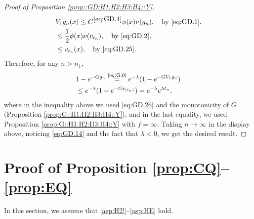 \documentclass[12pt,a4paper]{amsart}
\numberwithin{equation}{section}
\theoremstyle{plain}
\theoremstyle{definition}
\theoremstyle{remark}
\begin{document}
\begin{proof}[Proof of Proposition \ref{prop::GD:H1:H2:H3:H4::Y}]
\begin{align}
	& V_1g_n(x) \leq C^{\eqref{eq:GD.1}} \phi(x)\nu(g_n),\quad\text{by \eqref{eq:GD.1}},
	\\& \leq \frac{1}{2}\phi(x)\nu(v_{t_n}),\quad\text{by \eqref{eq:GD.2}},
	\\\label{eq:GD.26} & \leq v_{t_n}(x),\quad\text{by \eqref{eq:GD.25}}.
\end{align}
	Therefore, for any $n>n_1$,
\begin{align}
	& 1 - e^{- Gg_n}
	\overset{\text{\eqref{eq:G.0}}}= e^{- \lambda} (1- e^{- GV_1g_n})
	\\&\leq e^{- \lambda} (1- e^{- G v_{(t_n)}}) 
	= e^{- \lambda} e^{\lambda t_n},
\end{align}
	where in the inequality above we used \eqref{eq:GD.26} and the monotonicity of $G$ (Proposition \ref{prop:G::H1:H2:H3:H4::Y}), and in the last equality, we used Proposition \ref{prop:G::H1:H2:H3:H4::Y} with $f = \infty$.
	Taking $n\to \infty$ in the display above, noticing \eqref{eq:GD.14} and the fact that $\lambda < 0$, we get the desired result.
\end{proof}

\section{Proof of Proposition \ref{prop:CQ}--\ref{prop:EQ}}
In this section, we assume that \eqref{asp:H2!}--\eqref{asp:HE} hold.
\end{document}
